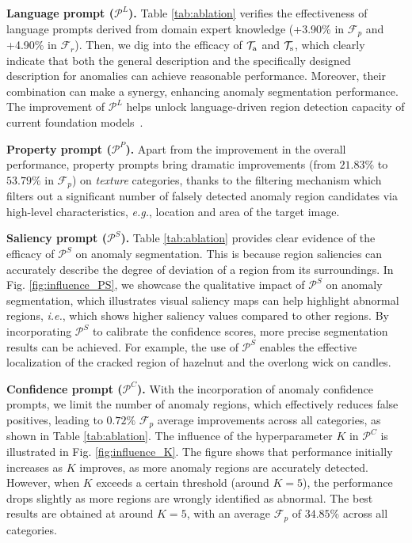 \noindent\textbf{Language prompt ($\mathcal{P}^L$).} Table \ref{tab:ablation} verifies the effectiveness of language prompts derived from domain expert knowledge (+3.90\% in $\mathcal{F}_p$ and +4.90\% in $\mathcal{F}_r$). Then, we dig into the efficacy of $\mathcal{T}_{\rm a}$ and $\mathcal{T}_ {\rm s}$, which clearly indicate that both the general description and the specifically designed description for anomalies can achieve reasonable performance. Moreover, their combination can make a synergy, enhancing anomaly segmentation performance. The improvement of $\mathcal{P}^L$ helps unlock language-driven region detection capacity of current foundation models~\cite{liu2023grounding,kirillov2023segment}. 

\noindent\textbf{Property prompt ($\mathcal{P}^P$).} Apart from the improvement in the overall performance, property prompts bring dramatic improvements (from $21.83\%$ to $53.79\%$ in $\mathcal{F}_p$) on \textit{texture} categories, thanks to the filtering mechanism which filters out a significant number of falsely detected anomaly region candidates via high-level characteristics, \textit{e.g.}, location and area of the target image. 

\noindent\textbf{Saliency prompt ($\mathcal{P}^S$).} Table \ref{tab:ablation} provides clear evidence of the efficacy of $\mathcal{P}^S$ on anomaly segmentation. This is because region saliencies can accurately describe the degree of deviation of a region from its surroundings. In Fig. \ref{fig:influence_PS}, we showcase the qualitative impact of $\mathcal{P}^S$ on anomaly segmentation, which illustrates visual saliency maps can help highlight abnormal regions, \textit{i.e.}, which shows higher saliency values compared to other regions. By incorporating $\mathcal{P}^S$ to calibrate the confidence scores, more precise segmentation results can be achieved. For example, the use of $\mathcal{P}^S$ enables the effective localization of the cracked region of hazelnut and the overlong wick on candles. 

\noindent\textbf{Confidence prompt ($\mathcal{P}^C$).} 
 With the incorporation of anomaly confidence prompts, we limit the number of anomaly regions, which effectively reduces false positives, leading to $0.72\%$ $\mathcal{F}_p$ average improvements across all categories, as shown in Table \ref{tab:ablation}.
The influence of the hyperparameter $K$ in $\mathcal{P}^C$ is illustrated in Fig. \ref{fig:influence_K}. The figure shows that performance initially increases as $K$ improves, as more anomaly regions are accurately detected. However, when $K$ exceeds a certain threshold (around $K=5$), the performance drops slightly as more regions are wrongly identified as abnormal. The best results are obtained at around $K=5$, with an average $\mathcal{F}_{p}$ of $34.85\%$  across all categories.

